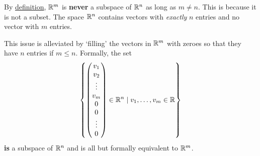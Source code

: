 \begin{warning}{}{}
 By \hyperref[def:subspace]{definition}, $\mathbb{R}^{m}$ is \textbf{never} a subspace
 of $\mathbb{R}^{n}$ as long as $m \neq n$. This is because it is not a subset. The
 space $\mathbb{R}^{n}$ contains vectors with \emph{exactly} $n$ entries and no vector
 with $m$ entries.

 This issue is alleviated by `filling' the vectors in $\mathbb{R}^{m}$ with zeroes so
 that they have $n$ entries if $m \leq n$. Formally, the set
 \[
  \left\{
   \begin{pmatrix}
    v_1\\
    v_2\\
    \vdots\\
    v_m\\
    0\\
    0\\
    \vdots\\
    0
   \end{pmatrix} \in \mathbb{R}^{n} \mid 
   v_1,\ldots,v_m \in \mathbb{R}
  \right\}
 \]
 \textbf{is} a subspace of $\mathbb{R}^{n}$ and is all but formally equivalent to
 $\mathbb{R}^{m}$.
\end{warning}

